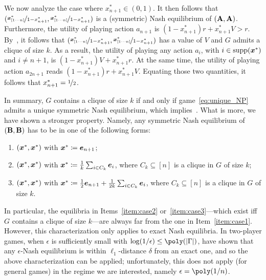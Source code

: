 We now analyze the case where $x^*_{n+1} \in (0, 1)$. It then follows that $(\nicefrac{{\bm{x}}^*_{[1 \cdots n]}}{1 - x^*_{n+1}}, \nicefrac{{\bm{x}}^*_{[1 \cdots n]}}{1 - x^*_{n+1}})$ is a (symmetric) Nash equilibrium of $(\mathbf{A}, \mathbf{A})$. Furthermore, the utility of playing action $a_{n+1}$ is $(1 - x^*_{n+1}) r + x^*_{n+1} V > r $. By~, it follows that $(\nicefrac{{\bm{x}}^*_{[1 \cdots n] }}{1 - x^*_{n+1}}, \nicefrac{{\bm{x}}^*_{[1 \cdots n]}}{1 - x^*_{n+1}})$ has a value of $V$ and $G$ admits a clique of size $k$. As a result, the utility of playing any action $a_i$, with $i \in \text{supp}({\bm{x}}^*)$ and $i \neq n+1$, is $( 1 - x^{*}_{n+1}) V + x^*_{n+1} r$. At the same time, the utility of playing action $a_{2n+1}$ reads $(1 - x_{n+1}^*) r + x_{n+1}^* V$. Equating those two quantities, it follows that $x^*_{n+1} = \nicefrac{1}{2}$.

In summary, $G$ contains a clique of size $k$ if and only if game~\eqref{eq:unique_NP} admits a unique symmetric Nash equilibrium, which implies~. What is more, we have shown a stronger property. Namely, any symmetric Nash equilibrium of $(\mathbf{B}, \mathbf{B})$ has to be in one of the following forms:
\begin{enumerate} \label{eq:three_exact_NE}
        \item $({\bm{x}}^*, {\bm{x}}^*)$ with ${\bm{x}}^* \coloneqq {\bm{e}}_{n+ 1}$;\label{item:case1}
        \item $({\bm{x}}^*, {\bm{x}}^*)$ with ${\bm{x}}^* \coloneqq \frac{1}{k} \sum_{i \in C_k} {\bm{e}}_i$, where $C_k \subseteq [n]$ is a clique in $G$ of size $k$;\label{item:case2}
        \item $({\bm{x}}^*, {\bm{x}}^*)$ with ${\bm{x}}^* \coloneqq \frac{1}{2} {\bm{e}}_{n + 1} + \frac{1}{2k} \sum_{i \in C_k} {\bm{e}}_i$, where $C_k \subseteq [n]$ is a clique in $G$ of size $k$.\label{item:case3}
\end{enumerate}
In particular, the equilibria in Items~\ref{item:case2} or~\ref{item:case3}---which exist iff $G$ contains a clique of size $k$---are always far from the one in Item~\ref{item:case1}. However, this characterization only applies to exact Nash equilibria. In two-player games, when $\epsilon$ is sufficiently small with $\log(1/\epsilon) \leq \poly(|\Gamma|)$, \citet{Etessami10:On} have shown that any $\epsilon$-Nash equilibrium is within $\ell_1$-distance $\delta$ from an exact one, and so the above characterization can be applied; unfortunately, this does not apply (for general games) in the regime we are interested, namely $\epsilon = \poly(1/n)$.

